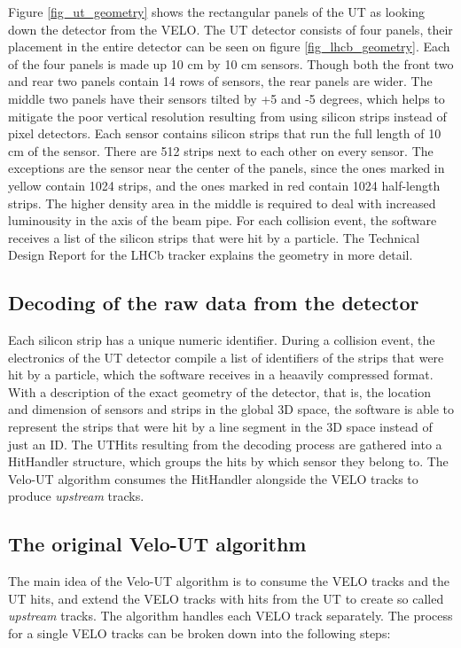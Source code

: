 \documentclass[12pt]{article}
\begin{document}
Figure \ref{fig_ut_geometry} shows the rectangular panels of the UT as looking down the detector from the VELO. The UT detector consists of four panels, their placement in the entire detector can be seen on figure \ref{fig_lhcb_geometry}. Each of the four panels is made up 10 cm by 10 cm sensors. Though both the front two and rear two panels contain 14 rows of sensors, the rear panels are wider. The middle two panels have their sensors tilted by +5 and -5 degrees, which helps to mitigate the poor vertical resolution resulting from using silicon strips instead of pixel detectors. Each sensor contains silicon strips that run the full length of 10 cm of the sensor. There are 512 strips next to each other on every sensor. The exceptions are the sensor near the center of the panels, since the ones marked in yellow contain 1024 strips, and the ones marked in red contain 1024 half-length strips. The higher density area in the middle is required to deal with increased luminousity in the axis of the beam pipe. For each collision event, the software receives a list of the silicon strips that were hit by a particle. The Technical Design Report for the LHCb tracker\cite{tracker_tdr} explains the geometry in more detail.


\subsection{Decoding of the raw data from the detector}

Each silicon strip has a unique numeric identifier. During a collision event, the electronics of the UT detector compile a list of identifiers of the strips that were hit by a particle, which the software receives in a heaavily compressed format. With a description of the exact geometry of the detector, that is, the location and dimension of sensors and strips in the global 3D space, the software is able to represent the strips that were hit by a line segment in the 3D space instead of just an ID. The UTHits resulting from the  decoding process are gathered into a HitHandler structure, which groups the hits by which sensor they belong to. The Velo-UT algorithm consumes the HitHandler alongside the VELO tracks to produce \textit{upstream} tracks.


\subsection{The original Velo-UT algorithm}\label{sec_velout_desc}

The main idea of the Velo-UT algorithm is to consume the VELO tracks and the UT hits, and extend the VELO tracks with hits from the UT to create so called \textit{upstream} tracks. The algorithm handles each VELO track separately. The process for a single VELO tracks can be broken down into the following steps:
\end{document}
